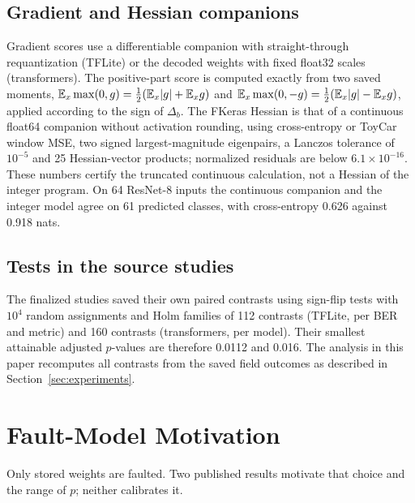 \subsection{Gradient and Hessian companions}
Gradient scores use a differentiable companion with straight-through requantization (TFLite) or the decoded weights with fixed float32 scales (transformers). The positive-part score is computed exactly from two saved moments, $\mathbb{E}_x\max(0,g)=\tfrac12(\mathbb{E}_x|g|+\mathbb{E}_x g)$ and $\mathbb{E}_x\max(0,-g)=\tfrac12(\mathbb{E}_x|g|-\mathbb{E}_x g)$, applied according to the sign of $\Delta_b$. The FKeras Hessian is that of a continuous float64 companion without activation rounding, using cross-entropy or ToyCar window MSE, two signed largest-magnitude eigenpairs, a Lanczos tolerance of $10^{-5}$ and 25 Hessian-vector products; normalized residuals are below $6.1\times10^{-16}$. These numbers certify the truncated continuous calculation, not a Hessian of the integer program. On 64 ResNet-8 inputs the continuous companion and the integer model agree on 61 predicted classes, with cross-entropy 0.626 against 0.918 nats.

\subsection{Tests in the source studies}
The finalized studies saved their own paired contrasts using sign-flip tests with $10^4$ random assignments and Holm families of 112 contrasts (TFLite, per BER and metric) and 160 contrasts (transformers, per model). Their smallest attainable adjusted $p$-values are therefore 0.0112 and 0.016. The analysis in this paper recomputes all contrasts from the saved field outcomes as described in Section~\ref{sec:experiments}.

\section{Fault-Model Motivation}\label{app:faultmotivation}
Only stored weights are faulted. Two published results motivate that choice and the range of $p$; neither calibrates it.

